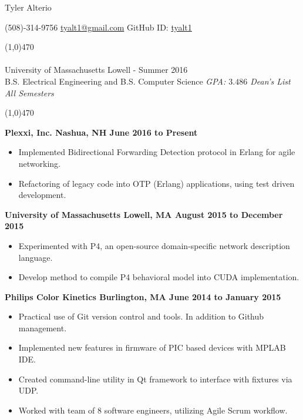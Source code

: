 \documentclass[11pt, a4paper]{article} %
\newcommand{\tinybullet}{ {\tiny \textbullet} }
\begin{document}
\centerline{\Huge \sc Tyler Alterio}

\centerline{
(508)-314-9756 \tinybullet \hspace{1pt}
\href{mailto:tyalt1@gmail.com}{tyalt1@gmail.com} \tinybullet \hspace{1pt}
GitHub ID: \href{http://www.github.com/tyalt1}{tyalt1}
}

\noindent \line(1,0){470}\\

\smallskip \\
University of Massachusetts Lowell - Summer 2016 \\
B.S. Electrical Engineering and B.S. Computer Science
\hfill {\it GPA: $3.486$ \tinybullet \hspace{1pt} Dean's List All Semesters}

\noindent \line(1,0){470}\\

\vspace{5pt}

\centerline{\bf Plexxi, Inc. \tinybullet \hspace{1pt} Nashua, NH \hfill June 2016 to Present}
\begin{itemize}
\itemsep0em
	\item Implemented Bidirectional Forwarding Detection protocol in Erlang for agile networking.
	\item Refactoring of legacy code into OTP (Erlang) applications, using test driven development.
\end{itemize}

\centerline{\bf University of Massachusetts \tinybullet \hspace{1pt} Lowell, MA \hfill August 2015 to December 2015}
\begin{itemize}
\itemsep0em
	\item Experimented with P4, an open-source domain-specific network description language.
	\item Develop method to compile P4 behavioral model into CUDA implementation.
\end{itemize}

\centerline{\bf Philips Color Kinetics \tinybullet \hspace{1pt} Burlington, MA \hfill June 2014 to January 2015}
\begin{itemize}
\itemsep0em
	\item Practical use of Git version control and tools. In addition to Github management.
	\item Implemented new features in firmware of PIC based devices with MPLAB IDE.
	\item Created command-line utility in Qt framework to interface with fixtures via UDP.
	\item Worked with team of 8 software engineers, utilizing Agile Scrum workflow.
\end{itemize}
\end{document}

